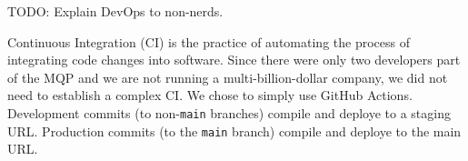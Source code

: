 TODO: Explain DevOps to non-nerds.


    Continuous Integration (CI) is the practice of automating the process of integrating code changes into software.
    Since there were only two developers part of the MQP and we are not running a multi-billion-dollar company, we did not need to establish a complex CI.
    We chose to simply use GitHub Actions.
    Development commits (to non-\texttt{main} branches) compile and deploye to a staging URL.
    Production commits (to the \texttt{main} branch) compile and deploye to the main URL.
